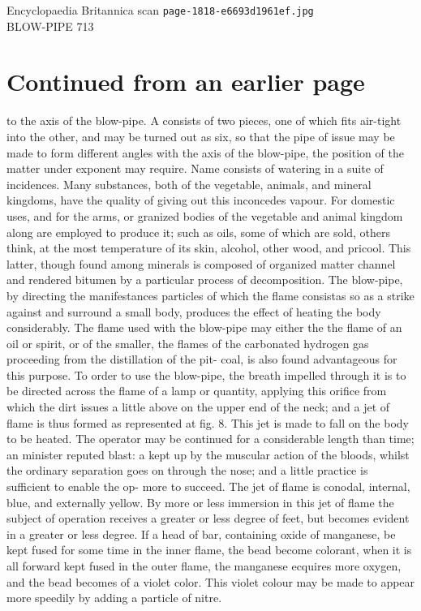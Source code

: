 \documentclass{article}
\begin{document}
\begin{center}
{\Large Encyclopaedia Britannica scan \texttt{page-1818-e6693d1961ef.jpg}}\\[0.5em]
BLOW-PIPE 713
\end{center}
\section*{Continued from an earlier page}
to the axis of the blow-pipe. A consists of two pieces, one of which fits air-tight into the other, and may be turned out as six, so that the pipe of issue may be made to form different angles with the axis of the blow-pipe, the position of the matter under exponent may require. Name consists of watering in a suite of incidences. Many substances, both of the vegetable, animals, and mineral kingdoms, have the quality of giving out this inconcedes vapour. For domestic uses, and for the arms, or granized bodies of the vegetable and animal kingdom along are employed to produce it; such as oils, some of which are sold, others think, at the most temperature of its skin, alcohol, other wood, and pricool. This latter, though found among minerals is composed of organized matter channel and rendered bitumen by a particular process of decomposition. The blow-pipe, by directing the manifestances particles of which the flame consistas so as a strike against and surround a small body, produces the effect of heating the body considerably. The flame used with the blow-pipe may either the the flame of an oil or spirit, or of the smaller, the flames of the carbonated hydrogen gas proceeding from the distillation of the pit- coal, is also found advantageous for this purpose. To order to use the blow-pipe, the breath impelled through it is to be directed across the flame of a lamp or quantity, applying this orifice from which the dirt issues a little above on the upper end of the neck; and a jet of flame is thus formed as represented at fig. 8. This jet is made to fall on the body to be heated. The operator may be continued for a considerable length than time; an minister reputed blast: a kept up by the muscular action of the bloods, whilst the ordinary separation goes on through the nose; and a little practice is sufficient to enable the op- more to succeed. The jet of flame is conodal, internal, blue, and externally yellow. By more or less immersion in this jet of flame the subject of operation receives a greater or less degree of feet, but becomes evident in a greater or less degree. If a head of bar, containing oxide of manganese, be kept fused for some time in the inner flame, the bead become colorant, when it is all forward kept fused in the outer flame, the manganese ecquires more oxygen, and the bead becomes of a violet color. This violet colour may be made to appear more speedily by adding a particle of nitre.
\end{document}
